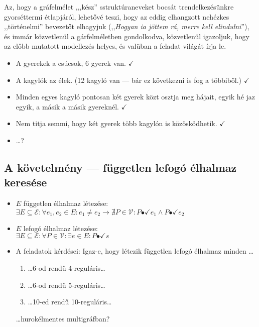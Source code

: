 \documentclass{article}
\newcommand{\incidsymbol}{\bullet\!\!\!\checkmark}
\newcommand{\incid}{\mathrel{\incidsymbol}} %
\begin{document}
	Az, hogy a  gráfelmélet ,,,kész'' sstruktúraneveket bocsát trendelkezésünkre gyorséttermi étlapjáról, lehetővé teszi, hogy az eddig elhangzott nehézkes ,,történelmi'' bevezetőt elhagyjuk (,,\textit{Hogyan ia jöttem rá, merre kell elindulni}''), és immár közvetlenül a gárfelméletben gondolkodva, közvetlenül igazoljuk, hogy az előbb mutatott modellezés helyes, és valüban a feladat világát írja le.

	\begin{itemize}
		\item A gyerekek a csúcsok, 6 gyerek van. $\checkmark$
		\item A kagylók az élek. (12 kagyló van --- bár ez következni is fog a többiből.) $\checkmark$
		\item Minden egyes kagyló pontosan két gyerek közt osztja meg hájait, egyik hé jaz  egyik, a másik a másik gyereknél. $\checkmark$
		\item Nem titja semmi, hogy két gyerek több kagylón is közösködhetik. $\checkmark$
		\item \dots?
	\end{itemize}

	\subsection{A követelmény --- független lefogó élhalmaz keresése}

	\begin{itemize}
		\item
		$E$ független  élhalmaz létezése:\\$\exists E \subseteq \mathcal E: \forall e_1, e_2 \in E: e_1 \neq e_2 \to \nexists P \in \mathcal V: P \incid e_1 \land P \incid e_2$
		\item
		$E$ lefogó élhalmaz létezése:\\$\exists E \subseteq \mathcal E: \forall P \in \mathcal V: \exists e \in E: P \incid s$
		\item
		A feladatok kérdései: Igaz-e, hogy létezik független lefogó élhalmaz minden \dots
		\begin{enumerate}
			\item \dots 6-od rendű 4-reguláris\dots 
			\item \dots 6-od rendű 5-reguláris\dots
			\item \dots 10-ed rendű 10-reguláris\dots
		\end{enumerate}
		\dots hurokélmentes multigráfban?
	\end{itemize}
\end{document}
